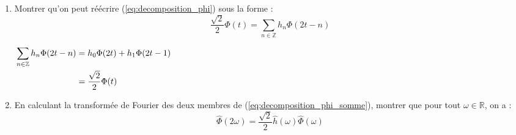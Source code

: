 \documentclass[12pt,a4paper]{article}
\begin{document}
\begin{enumerate}
    \item Montrer qu'on peut réécrire (\ref{eq:decomposition_phi}) sous la forme :
    \begin{equation}
        \frac{\sqrt{2}}{2} \Phi(t) = \sum_{n \in \mathbb{Z}} h_n \Phi(2t - n)
        \label{eq:decomposition_phi_somme}
    \end{equation}

    \color{blue}
    \begin{align*}
        \sum_{n \in \mathbb{Z}} h_n \Phi(2t - n) &= h_0 \Phi(2t) + h_1 \Phi(2t - 1) \hspace{14.5cm} \\
        &= \frac{\sqrt{2}}{2} \Phi(t)
    \end{align*}


    \color{black}
    \item En calculant la transformée de Fourier des deux membres de (\ref{eq:decomposition_phi_somme}), montrer que pour tout $\omega \in \mathbb{R}$, on a :
    \begin{equation}
        \hat{\Phi}(2\omega) = \frac{\sqrt{2}}{2} \hat{h}(\omega) \hat{\Phi}(\omega)
        \label{eq:decomposition_phi_fourier}
    \end{equation}


\end{enumerate}
\end{document}
